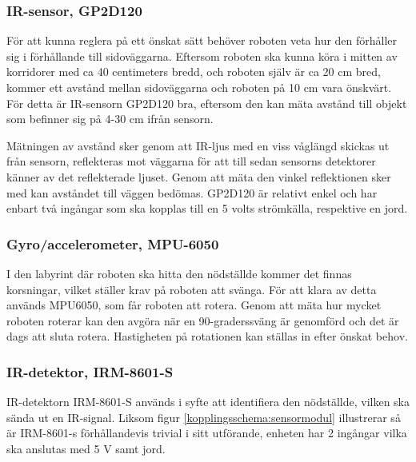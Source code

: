 \documentclass[11pt]{article}
\begin{document}
\begin{flushleft}

\subsubsection{IR-sensor, GP2D120}
För att kunna reglera på ett önskat sätt behöver roboten veta hur den förhåller sig i förhållande till sidoväggarna. Eftersom roboten ska kunna köra i mitten av korridorer med ca 40 centimeters bredd, och roboten själv är ca 20 cm bred, kommer ett avstånd mellan sidoväggarna och roboten på 10 cm vara önskvärt. För detta är IR-sensorn GP2D120 bra, eftersom den kan mäta avstånd till objekt som befinner sig på 4-30 cm ifrån sensorn. 

Mätningen av avstånd sker genom att IR-ljus med en viss våglängd skickas ut från sensorn, reflekteras mot väggarna för att till sedan sensorns detektorer känner av det reflekterade ljuset. Genom att mäta den vinkel reflektionen sker med kan avståndet till väggen bedömas. GP2D120 är relativt enkel och har enbart två ingångar som ska kopplas till en 5 volts strömkälla, respektive en jord. 

\subsubsection{Gyro/accelerometer, MPU-6050}
I den labyrint där roboten ska hitta den nödställde kommer det finnas korsningar, vilket ställer krav på roboten att svänga. För att klara av detta används MPU6050, som får roboten att rotera. Genom att mäta hur mycket roboten roterar kan den avgöra när en 90-graderssväng är genomförd och det är dags att sluta rotera. Hastigheten på rotationen kan ställas in efter önskat behov.
 
\subsubsection{IR-detektor, IRM-8601-S}
IR-detektorn IRM-8601-S används i syfte att identifiera den nödställde, vilken ska sända ut en IR-signal. Liksom figur \ref{kopplingsschema:sensormodul} illustrerar så är IRM-8601-s förhållandevis trivial i sitt utförande, enheten har 2 ingångar vilka ska anslutas med 5 V samt jord. 


\end{flushleft}
\end{document}
